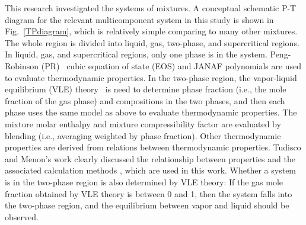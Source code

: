 This research investigated the systems of  mixtures. A conceptual schematic P-T diagram for the relevant  multicomponent system in this study is shown in Fig.~\ref{TPdiagram}, which is relatively simple comparing to many other mixtures. The whole region is divided into liquid, gas, two-phase, and supercritical regions. %
In liquid, gas, and supercritical regions, only one phase is in the system. Peng-Robinson (PR)~\citep{peng1976new} cubic equation of state (EOS) and JANAF polynomials are used to evaluate thermodynamic properties. In the two-phase region, the vapor-liquid equilibrium (VLE) theory~\cite{hanks1971calculation} is need to determine phase fraction (i.e., the mole fraction of the gas phase) and compositions in the two phases, and then each phase uses the same model as above to evaluate thermodynamic properties. The mixture molar enthalpy and mixture compressibility factor are evaluated by blending (i.e., averaging weighted by phase fraction). Other thermodynamic properties are derived from relations between thermodynamic properties. Tudisco and Menon's work clearly discussed the relationship between properties and the associated calculation methods \cite{tudisco2020analytical}, which are used in this work. Whether a system is in the two-phase region is also determined by VLE theory: If the gas mole fraction obtained by VLE theory is between 0 and 1, then the system falls into the two-phase region, and the equilibrium between vapor and liquid should be observed.

